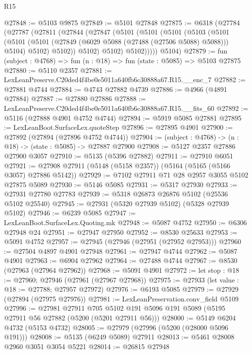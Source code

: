 \begin{lexlean}{R15}
\begin{coremodule}
{{{{{{{{{{{@27848 := @5103 @9875
@27849 := @5101 @27848
@27875 := @6318
    (@27784
      (@27787
        (@27811
          (@27844
            (@27847
              (@5101
                (@5101
                  (@5101
                    (@5103
                      (@5101
                        (@5101
                          (@5101 (@27849 (@6029 @5088 (@27488 (@27506 @5088) @5088))) @5104)
                          @5102)
                        @5102))
                    @5102)
                  @5102)
                @5102)))))
      @5104)
@27879 := fun (subject : @4768) => fun (n : @18) => fun (state : @5085) => @5103 @27875
@27880 := @5110 @2357
@27881 := LexLeanPreserve.C20ded4f4be0e5011a640fb6c30888a67.R15.__enc_7
@27882 := @27881 @4744
@27884 := @4743 @27882 @4739
@27886 := @4966 (@4891 @27884)
@27887 := @27880 @27886
@27888 := LexLeanPreserve.C20ded4f4be0e5011a640fb6c30888a67.R15.__fits_60
@27892 := @5116 (@27888 @4901 @4752 @4744)
@27894 := @5919 @5085 @27881
@27895 := LexLeanBoot.SurfaceLex.quoteStep
@27896 := @27895 @4901
@27900 := @27892 (@27894 (@27896 @4752 @4744))
@27904 := (subject : @4768) -> (n : @18) -> (state : @5085) -> @27887 @27900
@27908 := @5127 @2357 @27886 @27900 @3057
@27910 := @5135 (@5396 @27882)
@27911 := @27910 @6051
@27921 := @27908 @27911 (@5148 (@5158 @2357)) (@5164 (@5165 (@5166 @3057) @27886 @5142))
@27929 := @7102 @27911 @71 @28 @2957 @3055 @5102 @27875 @5089
@27930 := @5146 @5085
@27931 := @5317 @27930
@27933 := @27931 @27780 @27783
@27939 := @5318 @26873 @26876 @5102 (@25536 @5102 @25540)
@27945 := @27931 (@5320 @27939 @5102) (@5328 @27939 @5102)
@27946 := @6239 @5085
@27947 := LexLeanBoot.SurfaceLex.Quoting.mk
@27948 := @5087 @4752
@27950 := @6306 @27948 @24
@27951 := @27947 @27950
@27952 := @8530 @25633
@27953 := @5091 @4752
@27957 := @27945 (@27946 (@27951 (@27952 @27953)))
@27960 := @27504 @4897 @4901 @27948
@27961 := @27947 @4744
@27962 := @5087 @4901
@27963 := @6904 @27962
@27964 := @27488 @4744
@27967 := @8530 (@27963 (@27964 @27962))
@27968 := @5091 @4901
@27972 := let stop : @18 := @27960; @27946 (@27961 (@27967 @27968))
@27975 := @27933 (let value : @18 := @27788; @27957 @27972)
@27976 := @6193 @5085
@27979 := @27929 (@27894 (@27975 @27976))
@27981 := LexLeanPreservation.conv_field @5109
@27996 := @27981
    @27911
    @705
    @5102
    @191
    @5096
    @191
    @5089
    (@5195 @27911 @56 @27882 (@5200 (@5201 @27911 @56)))
@28000 := @5149 @6204 @4732 (@5153 @4732)
@28005 := @27979 (@27996 (@5200 (@28000 @5096 @191)))
@28008 := @5135 (@6249 @5089) @27911
@28013 := @5461 @28008 @2960 @3051 @3054 @5221
@28014 := @26815 @27948
}}}}}}}}}}}
\end{coremodule}
\end{lexlean}
